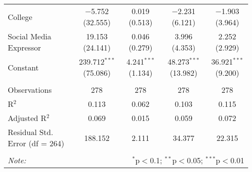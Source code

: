 \begin{table}[H]
{\begin{tabular}{@{\extracolsep{5pt}}lcccc}
  College & $-$5.752 (32.555) & 0.019 (0.513) & $-$2.231 (6.121) & $-$1.903 (3.964) \\ 
  Social Media Expressor & 19.153 (24.141) & 0.046 (0.279) & 3.996 (4.353) & 2.252 (2.929) \\ 
  Constant & 239.712$^{***}$ (75.086) & 4.241$^{***}$ (1.134) & 48.273$^{***}$ (13.982) & 36.921$^{***}$ (9.200) \\ 
 \hline \\[-1.8ex] 
Observations & 278 & 278 & 278 & 278 \\ 
R$^{2}$ & 0.113 & 0.062 & 0.103 & 0.115 \\ 
Adjusted R$^{2}$ & 0.069 & 0.015 & 0.059 & 0.072 \\ 
Residual Std. Error (df = 264) & 188.152 & 2.111 & 34.377 & 22.315 \\ 
\hline 
\hline \\[-1.8ex] 
\textit{Note:}  & \multicolumn{4}{r}{$^{*}$p$<$0.1; $^{**}$p$<$0.05; $^{***}$p$<$0.01} \\ 
\end{tabular} 
}
\end{table} 
